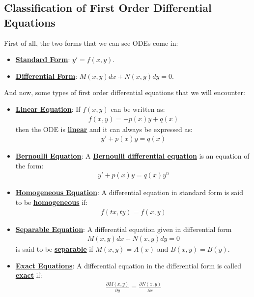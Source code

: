 \documentclass[11pt]{article}
\newcommand{\dfn}[1]{\underline{\textbf{#1}}}
\begin{document}
\subsection{Classification of First Order Differential Equations}
First of all, the two forms that we can see ODEs come in: 
\begin{itemize}[noitemsep]
	\item \dfn{Standard Form}: $y' = f(x,y)$. 
	\item \dfn{Differential Form}: $M(x,y) dx + N(x,y) dy =0$. 
\end{itemize}
And now, some types of first order differential equations that we will encounter: 
\begin{itemize}[noitemsep]
	\item \dfn{Linear Equation}: If $f(x,y)$ can be written as: 
	\begin{align}
		f(x,y) = -p(x) y + q(x) 	
	\end{align}
	then the ODE is \dfn{linear} and it can always be expressed as: 
	\begin{align}
		y' + p(x) y = q(x) 	
	\end{align}
	\item \dfn{Bernoulli Equation}: A \dfn{Bernoulli differential equation} is an equation of the form: 
	\begin{align}
		y' + p(x) y = q(x) y^n	
	\end{align}
	\item \dfn{Homogeneous Equation}: A differential equation in standard form is said to be \dfn{homogeneous} if:
	\begin{align}
		f(tx, ty) = f(x,y) 	
	\end{align}
	\item \dfn{Separable Equation}: A differential equation given in differential form 
	\begin{align*}
			M(x,y) dx + N(x,y) dy = 0 
	\end{align*}
	is said to be \dfn{separable} if $M(x,y) = A(x)$ and $B(x,y) = B(y)$. 
	\item \dfn{Exact Equations}: A differential equation in the differential form is called \dfn{exact} if: 
	\begin{align}
		\frac{\partial M(x,y)}{\partial y} = \frac{\partial N(x,y)}{\partial x}	
	\end{align}

\end{itemize}
\end{document}
